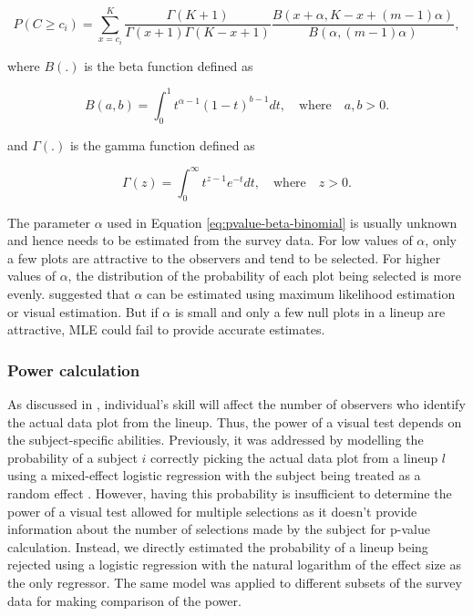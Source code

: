 \documentclass[]{interact}
\theoremstyle{plain}%
\theoremstyle{definition}
\theoremstyle{remark}
\begin{document}
\begin{equation} \label{eq:pvalue-beta-binomial}
P(C \geq c_i) = \sum_{x=c_i}^{K}\frac{\Gamma(K + 1)}{\Gamma(x + 1)\Gamma(K - x + 1)}\frac{B(x + \alpha, K - x + (m - 1)\alpha)}{B(\alpha, (m-1)\alpha)},
\end{equation}

where \(B(.)\) is the beta function defined as

\begin{equation} \label{eq:betafunction}
B(a, b) = \int_{0}^{1}t^{\alpha - 1}(1-t)^{b-1}dt,\quad \text{where}\quad a,b>0. 
\end{equation}

and \(\Gamma(.)\) is the gamma function defined as

\begin{equation} \label{eq:gammafunction}
\Gamma(z) = \int_{0}^{\infty}t^{z - 1}e^{-t}dt,\quad \text{where}\quad z>0. 
\end{equation}

The parameter \(\alpha\) used in Equation \ref{eq:pvalue-beta-binomial}
is usually unknown and hence needs to be estimated from the survey data.
For low values of \(\alpha\), only a few plots are attractive to the
observers and tend to be selected. For higher values of \(\alpha\), the
distribution of the probability of each plot being selected is more
evenly. \citet{vanderplas2021statistical} suggested that \(\alpha\) can
be estimated using maximum likelihood estimation or visual estimation.
But if \(\alpha\) is small and only a few null plots in a lineup are
attractive, MLE could fail to provide accurate estimates.

\hypertarget{power-calculation}{%
\subsubsection{Power calculation}\label{power-calculation}}

As discussed in \citet{majumder_validation_2013}, individual's skill
will affect the number of observers who identify the actual data plot
from the lineup. Thus, the power of a visual test depends on the
subject-specific abilities. Previously, it was addressed by modelling
the probability of a subject \(i\) correctly picking the actual data
plot from a lineup \(l\) using a mixed-effect logistic regression with
the subject being treated as a random effect
\citep{majumder_validation_2013}. However, having this probability is
insufficient to determine the power of a visual test allowed for
multiple selections as it doesn't provide information about the number
of selections made by the subject for p-value calculation. Instead, we
directly estimated the probability of a lineup being rejected using a
logistic regression with the natural logarithm of the effect size as the
only regressor. The same model was applied to different subsets of the
survey data for making comparison of the power.
\end{document}
